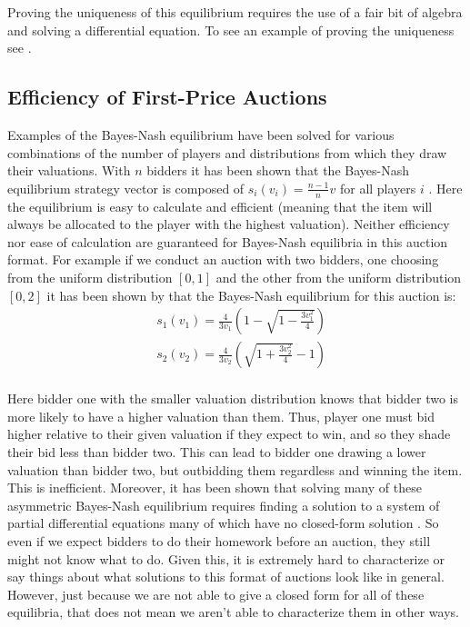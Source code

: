 \documentclass[12pt,twoside]{reedthesis}
\begin{document}
Proving the uniqueness of this equilibrium requires the use of a fair bit of algebra and solving a differential equation. To see an example of proving the uniqueness see \citet{Levin2002}.

\subsection{Efficiency of First-Price Auctions}
Examples of the Bayes-Nash equilibrium have been solved for various combinations of the number of players and distributions from which they draw their valuations. With $n$ bidders it has been shown that the Bayes-Nash equilibrium strategy vector is composed of $s_i(v_i) = \frac{n-1}{n} v$ for all players $i$ \citep{Chawla2013}. Here the equilibrium is easy to calculate and efficient (meaning that the item will always be allocated to the player with the highest valuation). Neither efficiency nor ease of calculation are guaranteed for Bayes-Nash equilibria in this auction format. For example if we conduct an auction with two bidders, one choosing from the uniform distribution $[0,1]$ and the other from the uniform distribution $[0,2]$ it has been shown by \citet{Krishna2002} that the Bayes-Nash equilibrium for this auction is:
\begin{align*}
	&s_1(v_1) = \frac{4}{3 v_1} \left(1 - \sqrt{1 - \frac{3v_1^2}{4}}\right)\\
	&s_2(v_2) = \frac{4}{3 v_2} \left(\sqrt{1 + \frac{3v_2^2}{4}} - 1 \right)\\
\end{align*}

Here bidder one with the smaller valuation distribution knows that bidder two is more likely to have a higher valuation than them. Thus, player one must bid higher relative to their given valuation if they expect to win, and so they shade their bid less than bidder two. This can lead to bidder one drawing a lower valuation than bidder two, but outbidding them regardless and winning the item. This is inefficient. Moreover, it has been shown that solving many of these asymmetric Bayes-Nash equilibrium requires finding a solution to a system of partial differential equations many of which have no closed-form solution \citep{Roughgarden2017}. So even if we expect bidders to do their homework before an auction, they still might not know what to do. Given this, it is extremely hard to characterize or say things about what solutions to this format of auctions look like in general. However, just because we are not able to give a closed form for all of these equilibria, that does not mean we aren't able to characterize them in other ways.
\end{document}
